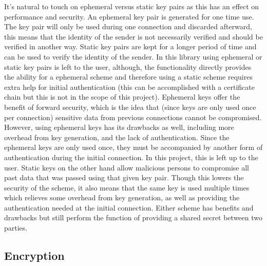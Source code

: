 It's natural to touch on ephemeral versus static key pairs as this has an effect on performance and security. An ephemeral key pair is generated for one time use. The key pair will only be used during one connection and discarded afterward, this means that the identity of the sender is not necessarily verified and should be verified in another way. Static key pairs are kept for a longer period of time and can be used to verify the identity of the sender. In this library using ephemeral or static key pairs is  left to the user, although, the functionality directly provides the ability for a ephemeral scheme and therefore using a static scheme requires extra help for initial authentication (this can be accomplished with a certificate chain but this is not in the scope of this project). Ephemeral keys offer the benefit of forward security, which is the idea that (since keys are only used once per connection) sensitive data from previous connections cannot be compromised. However, using ephemeral keys has its drawbacks as well, including more overhead from key generation, and the lack of authentication. Since the ephemeral keys are only used once, they must be accompanied by another form of authentication during the initial connection. In this project, this is left up to the user. Static keys on the other hand allow malicious persons to compromise all past data that was passed using that given key pair. Though this lowers the security of the scheme, it also means that the same key is used multiple times which relieves some overhead from key generation, as well as providing the authentication needed at the initial connection. Either scheme has benefits and drawbacks but still perform the function of providing a shared secret between two parties.

\subsection{Encryption}


